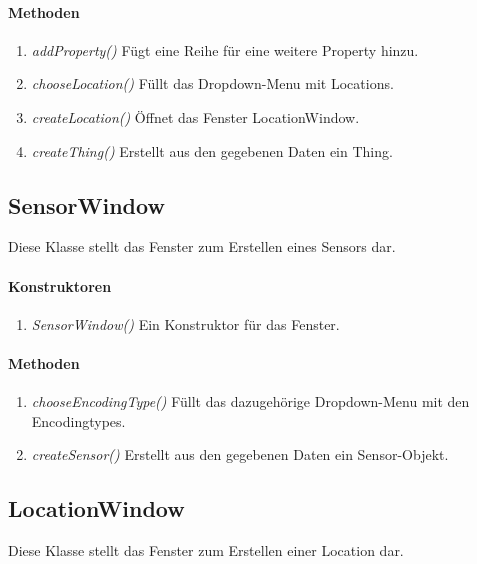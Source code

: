 \paragraph{Methoden}

\begin{enumerate}[+]
	\item \textit{addProperty()} Fügt eine Reihe für eine weitere Property hinzu.
	\item \textit{chooseLocation()} Füllt das Dropdown-Menu mit Locations. 
	\item \textit{createLocation()} Öffnet das Fenster LocationWindow.
	\item \textit{createThing()} Erstellt aus den gegebenen Daten ein Thing.
\end{enumerate}



\subsection{SensorWindow}
Diese Klasse stellt das Fenster zum Erstellen eines Sensors dar.

\paragraph{Konstruktoren}
\begin{enumerate}[+]
	\item \textit{SensorWindow()} Ein Konstruktor für das Fenster.
\end{enumerate}

\paragraph{Methoden}

\begin{enumerate}[+]
	\item \textit{chooseEncodingType()} Füllt das dazugehörige Dropdown-Menu mit den Encodingtypes.
	\item \textit{createSensor()} Erstellt aus den gegebenen Daten ein Sensor-Objekt.
		
\end{enumerate}



\subsection{LocationWindow}
Diese Klasse stellt das Fenster zum Erstellen einer Location dar.

